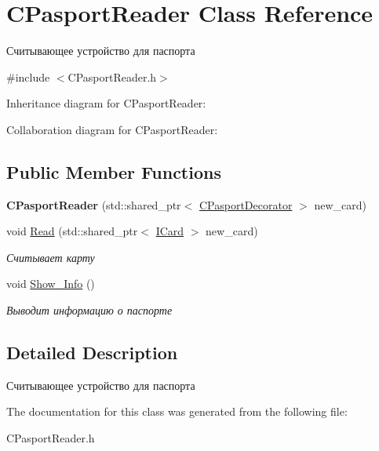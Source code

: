 \hypertarget{classCPasportReader}{}\section{C\+Pasport\+Reader Class Reference}
\label{classCPasportReader}


Считывающее устройство для паспорта  




{\ttfamily \#include $<$C\+Pasport\+Reader.\+h$>$}



Inheritance diagram for C\+Pasport\+Reader\+:


Collaboration diagram for C\+Pasport\+Reader\+:
\subsection*{Public Member Functions}
\begin{DoxyCompactItemize}
\item 
{\bfseries C\+Pasport\+Reader} (std\+::shared\+\_\+ptr$<$ \hyperlink{classCPasportDecorator}{C\+Pasport\+Decorator} $>$ new\+\_\+card)\hypertarget{classCPasportReader_ad3f7b9845ed5f6b2c17be97df03af96c}{}\label{classCPasportReader_ad3f7b9845ed5f6b2c17be97df03af96c}

\item 
void \hyperlink{classCPasportReader_a0e49231696922874f54f4cc9614c33ee}{Read} (std\+::shared\+\_\+ptr$<$ \hyperlink{classICard}{I\+Card} $>$ new\+\_\+card)\hypertarget{classCPasportReader_a0e49231696922874f54f4cc9614c33ee}{}\label{classCPasportReader_a0e49231696922874f54f4cc9614c33ee}

\begin{DoxyCompactList}\small\item\em Считывает карту \end{DoxyCompactList}\item 
void \hyperlink{classCPasportReader_a8228cc0ffa7a791aff639bf96aadc759}{Show\+\_\+\+Info} ()\hypertarget{classCPasportReader_a8228cc0ffa7a791aff639bf96aadc759}{}\label{classCPasportReader_a8228cc0ffa7a791aff639bf96aadc759}

\begin{DoxyCompactList}\small\item\em Выводит информацию о паспорте \end{DoxyCompactList}\end{DoxyCompactItemize}


\subsection{Detailed Description}
Считывающее устройство для паспорта 

The documentation for this class was generated from the following file\+:\begin{DoxyCompactItemize}
\item 
C\+Pasport\+Reader.\+h\end{DoxyCompactItemize}
